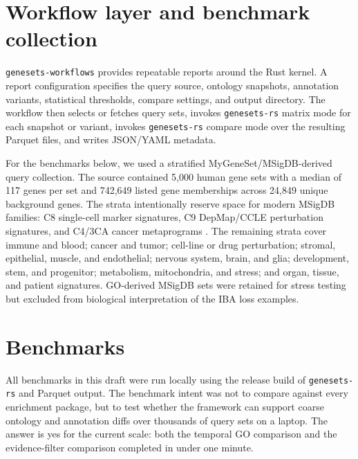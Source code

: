\documentclass[11pt]{article}
\newcommand{\tool}{\texttt{genesets-rs}}
\newcommand{\workflow}{\texttt{genesets-workflows}}
\begin{document}
\section{Workflow layer and benchmark collection}

\workflow{} provides repeatable reports around the Rust kernel. A report configuration specifies the query source, ontology snapshots, annotation variants, statistical thresholds, compare settings, and output directory. The workflow then selects or fetches query sets, invokes \tool{} matrix mode for each snapshot or variant, invokes \tool{} compare mode over the resulting Parquet files, and writes JSON/YAML metadata.

For the benchmarks below, we used a stratified MyGeneSet/MSigDB-derived query collection. The source contained 5,000 human gene sets with a median of 117 genes per set and 742,649 listed gene memberships across 24,849 unique background genes. The strata intentionally reserve space for modern MSigDB families: C8 single-cell marker signatures, C9 DepMap/CCLE perturbation signatures, and C4/3CA cancer metaprograms \citep{msigdb_collections}. The remaining strata cover immune and blood; cancer and tumor; cell-line or drug perturbation; stromal, epithelial, muscle, and endothelial; nervous system, brain, and glia; development, stem, and progenitor; metabolism, mitochondria, and stress; and organ, tissue, and patient signatures. GO-derived MSigDB sets were retained for stress testing but excluded from biological interpretation of the IBA loss examples.

\section{Benchmarks}

All benchmarks in this draft were run locally using the release build of \tool{} and Parquet output. The benchmark intent was not to compare against every enrichment package, but to test whether the framework can support coarse ontology and annotation diffs over thousands of query sets on a laptop. The answer is yes for the current scale: both the temporal GO comparison and the evidence-filter comparison completed in under one minute.
\end{document}
